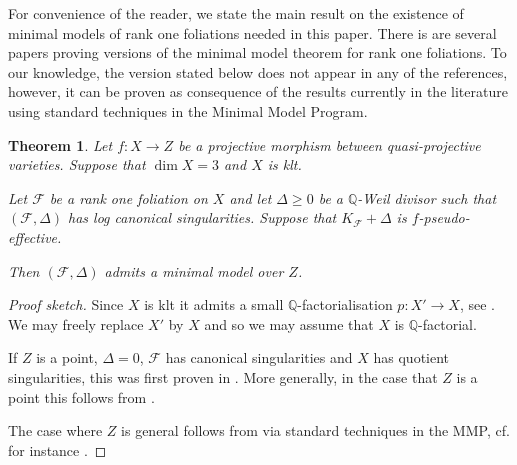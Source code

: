 \documentclass[12pt, a4paper]{amsart}
\newcounter{Theorem}
\newtheorem{theorem}{Theorem}[section]
\theoremstyle{definition}
\theoremstyle{named}
\begin{document}
For convenience of the reader, we state the main result on the existence of minimal models of rank one foliations
needed in this paper.  
There is are several papers proving versions of the minimal model theorem for rank one foliations.  To our knowledge, the version stated below does not appear in any of the references, however, it can be proven as consequence of the results currently in the literature using standard techniques in the Minimal Model Program.





\begin{theorem}
\label{thm_mmp}
    Let $f\colon X \to Z$ be a projective morphism between quasi-projective varieties.
    Suppose that $\dim X = 3$ and $X$ is klt.

    Let $\mathcal F$ be a rank one foliation on $X$ and let $\Delta \ge 0$ be a $\mathbb Q$-Weil divisor such that $(\mathcal F, \Delta)$ has log canonical singularities.
Suppose that $K_{\mathcal F}+\Delta$ is $f$-pseudo-effective.

Then $(\mathcal F, \Delta)$ admits a minimal model over $Z$.
\end{theorem}
\begin{proof}[Proof sketch]
Since $X$ is klt it admits a small $\mathbb Q$-factorialisation $p\colon X' \to X$, see \cite[Corollary 1.4.3]{BCHM10}.  We may freely replace $X'$ by $X$ and so we may assume that $X$ is $\mathbb Q$-factorial.

    If $Z$ is a point, $\Delta = 0$, $\mathcal F$ has canonical singularities and $X$ has quotient singularities, this was first proven in \cite{McQ05}.
    More generally, in the case that $Z$ is a point this follows from \cite[Theorem 8.10]{CS20}.

    The case where $Z$ is general follows from \cite[Theorem 8.10]{CS20} via standard techniques in the MMP, cf. for instance \cite[Theorem 5.9]{MR4669316}.
\end{proof}
\end{document}
